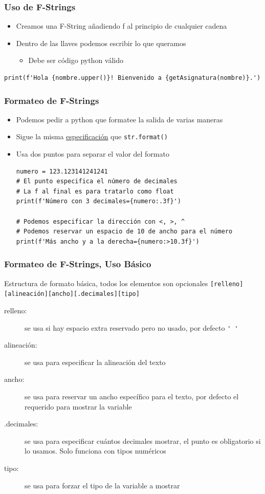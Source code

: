 \documentclass[11pt]{beamer}
\begin{document}
\begin{frame}[fragile]\frametitle{Uso de F-Strings}
\begin{itemize}
\item Creamos una F-String añadiendo f al principio de cualquier cadena
\item Dentro de las llaves podemos escribir lo que queramos
    \begin{itemize}
    \item Debe ser código python válido
    \end{itemize}
\end{itemize}
\begin{lstlisting}
print(f'Hola {nombre.upper()}! Bienvenido a {getAsignatura(nombre)}.')
\end{lstlisting}
\end{frame}

\begin{frame}[fragile]\frametitle{Formateo de F-Strings}
\begin{itemize}
\item Podemos pedir a python que formatee la salida de varias maneras
\item Sigue la misma \href{https://docs.python.org/3/library/string.html#format-specification-mini-language}{\color{blue}\underline{especificación}} que \lstinline|str.format()|
\item Usa dos puntos para separar el valor del formato
\begin{lstlisting}[basicstyle=\small]
numero = 123.123141241241
# El punto especifica el número de decimales
# La f al final es para tratarlo como float
print(f'Número con 3 decimales={numero:.3f}')

# Podemos especificar la dirección con <, >, ^
# Podemos reservar un espacio de 10 de ancho para el número
print(f'Más ancho y a la derecha={numero:>10.3f}')
\end{lstlisting}
\end{itemize}
\end{frame}

\begin{frame}[fragile]\frametitle{Formateo de F-Strings, Uso Básico}
\begin{block}{Estructura de formato básica, todos los elementos son opcionales}
\centering\verb|[relleno][alineación][ancho][.decimales][tipo]|
\end{block}
\begin{description}
\item[relleno:] se usa si hay espacio extra reservado pero no usado, por defecto \lstinline|' '| 
\item[alineación:] se usa para especificar la alineación del texto
\item[ancho:] se usa para reservar un ancho específico para el texto, por defecto el requerido para mostrar la variable
\item[.decimales:] se usa para especificar cuántos decimales mostrar, el punto es obligatorio si lo usamos. Solo funciona con tipos numéricos
\item[tipo:] se usa para forzar el tipo de la variable a mostrar
\end{description}
\end{frame}
\end{document}
